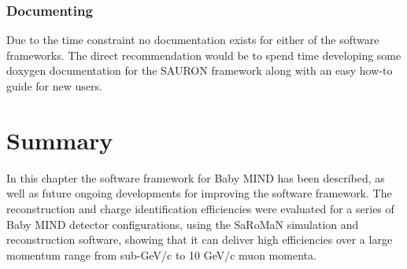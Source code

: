 \subsubsection{Documenting}
Due to the time constraint no documentation exists for either of the software frameworks. The direct recommendation would be to spend time developing some doxygen documentation for the SAURON framework along with an easy how-to guide for new users.
\fi
\section{Summary}
In this chapter the software framework for Baby MIND has been described, as well as future ongoing developments for improving the software framework. The reconstruction and charge identification efficiencies were evaluated for a series of Baby MIND detector configurations, using the SaRoMaN simulation and reconstruction software, showing that it can deliver high efficiencies over a large momentum range from sub-GeV/c to 10 GeV/c muon momenta.
